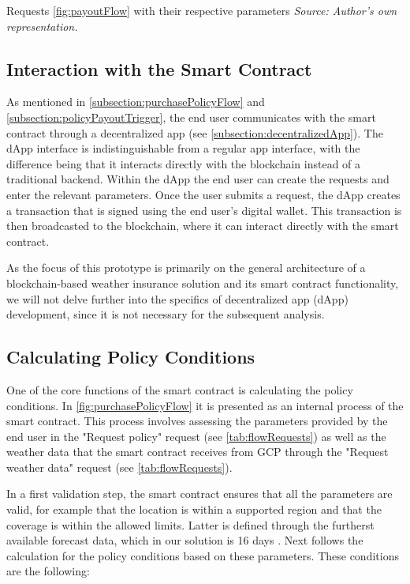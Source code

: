 \begin{table}[h]
    \centering
    
    \caption{Requests \cref{fig:payoutFlow} with their respective parameters \textit{Source: Author's own representation.}}
    \label{tab:payoutFlowRequests}
\end{table}

\subsection{Interaction with the Smart Contract}\label{interaction_with_smartcontract}

As mentioned in \cref{subsection:purchasePolicyFlow} and \cref{subsection:policyPayoutTrigger}, the end user communicates with the smart contract through a decentralized app (see \cref{subsection:decentralizedApp}). The dApp interface is indistinguishable from a regular app interface, with the difference being that it interacts directly with the blockchain instead of a traditional backend. Within the dApp the end user can create the requests and enter the relevant parameters. Once the user submits a request, the dApp creates a transaction that is signed using the end user's digital wallet. This transaction is then broadcasted to the blockchain, where it can interact directly with the smart contract.

As the focus of this prototype is primarily on the general architecture of a blockchain-based weather insurance solution and its smart contract functionality, we will not delve further into the specifics of decentralized app (dApp) development, since it is not necessary for the subsequent analysis.

\subsection{Calculating Policy Conditions}

One of the core functions of the smart contract is calculating the policy conditions. In \cref{fig:purchasePolicyFlow} it is presented as an internal process of the smart contract. This process involves assessing the parameters provided by the end user in the "Request policy" request (see \cref{tab:flowRequests}) as well as the weather data that the smart contract receives from GCP through the "Request weather data" request (see \cref{tab:flowRequests}).

In a first validation step, the smart contract ensures that all the parameters are valid, for example that the location is within a supported region and that the coverage is within the allowed limits. Latter is defined through the furtherst available forecast data, which in our solution is 16 days \autocite{NOAA_GFS}. Next follows the calculation for the policy conditions based on these parameters. These conditions are the following:

